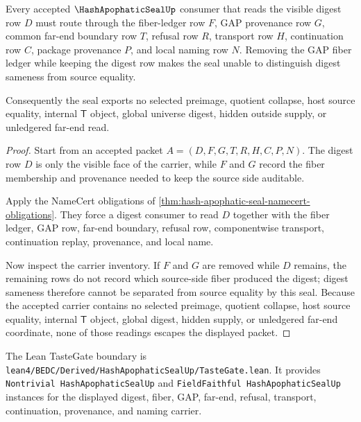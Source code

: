 \begin{theorem}
\label{thm:hash-apophatic-seal-fiber-nonescape}
Every accepted $\HashApophaticSealUp$ consumer that reads the visible digest row $D$ must route through the fiber-ledger row $F$, GAP provenance row $G$, common far-end boundary row $T$, refusal row $R$, transport row $H$, continuation row $C$, package provenance $P$, and local naming row $N$. Removing the GAP fiber ledger while keeping the digest row makes the seal unable to distinguish digest sameness from source equality.

Consequently the seal exports no selected preimage, quotient collapse, host source equality, internal $\mathsf{T}$ object, global universe digest, hidden outside supply, or unledgered far-end read.
\end{theorem}
\begin{proof}
Start from an accepted packet $A=(D,F,G,T,R,H,C,P,N)$. The digest row $D$ is only the visible face of the carrier, while $F$ and $G$ record the fiber membership and provenance needed to keep the source side auditable.

Apply the NameCert obligations of \autoref{thm:hash-apophatic-seal-namecert-obligations}. They force a digest consumer to read $D$ together with the fiber ledger, GAP row, far-end boundary, refusal row, componentwise transport, continuation replay, provenance, and local name.

Now inspect the carrier inventory. If $F$ and $G$ are removed while $D$ remains, the remaining rows do not record which source-side fiber produced the digest; digest sameness therefore cannot be separated from source equality by this seal. Because the accepted carrier contains no selected preimage, quotient collapse, host source equality, internal $\mathsf{T}$ object, global digest, hidden supply, or unledgered far-end coordinate, none of those readings escapes the displayed packet.
\end{proof}



The Lean TasteGate boundary is \texttt{lean4/BEDC/Derived/HashApophaticSealUp/TasteGate.lean}. It provides \texttt{Nontrivial HashApophaticSealUp} and \texttt{FieldFaithful HashApophaticSealUp} instances for the displayed digest, fiber, GAP, far-end, refusal, transport, continuation, provenance, and naming carrier.

